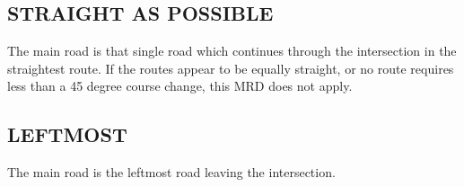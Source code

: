 \subsection{STRAIGHT AS POSSIBLE}
The main road is that single road which continues through the intersection in the straightest route.  If the routes appear to be equally straight, or no route requires less than a 45 degree course change, this MRD does not apply.

\subsection{LEFTMOST}
The main road is the leftmost road leaving the intersection.